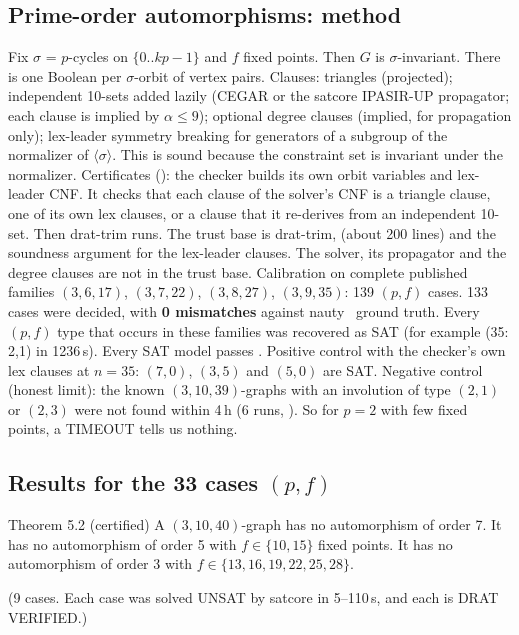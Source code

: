 \subsection{Prime-order automorphisms: method}\label{sec:sym-method}
Fix $\sigma$ = $p$-cycles on $\{0..kp-1\}$ and $f$ fixed points. Then $G$ is $\sigma$-invariant. There is one Boolean
per $\sigma$-orbit of vertex pairs. Clauses: triangles (projected); independent 10-sets added lazily
(CEGAR or the satcore IPASIR-UP propagator; each clause is implied by $\alpha \le 9$); optional degree
clauses (implied, for propagation only); lex-leader symmetry breaking for generators of a subgroup
of the normalizer of $\langle\sigma\rangle$. This is sound because the constraint set is invariant under the normalizer.
Certificates (): the checker builds its own orbit variables and lex-leader CNF. It
checks that each clause of the solver's CNF is a triangle clause, one of its own lex clauses, or a
clause that it re-derives from an independent 10-set. Then drat-trim runs. The trust base is drat-trim,
 (about 200 lines) and the soundness argument for the lex-leader clauses. The solver,
its propagator and the degree clauses are not in the trust base.
Calibration on complete published families $(3,6,17)$, $(3,7,22)$, $(3,8,27)$, $(3,9,35)$: 139 $(p,f)$
cases. 133 cases were decided, with \textbf{0 mismatches} against nauty~\cite{nauty14} ground truth. Every $(p,f)$ type that
occurs in these families was recovered as SAT (for example (35: 2,1) in 1236\,s). Every SAT model passes
. Positive control with the checker's own lex clauses at $n = 35$: $(7,0)$, $(3,5)$
and $(5,0)$ are SAT.
Negative control (honest limit): the known $(3,10,39)$-graphs with an involution of type $(2,1)$ or $(2,3)$
were not found within 4\,h (6 runs, ). So for $p = 2$ with few fixed points,
a TIMEOUT tells us nothing.

\subsection{Results for the 33 cases \texorpdfstring{$(p, f)$}{(p,f)}}\label{sec:sym-results}
\begin{namedthm}{Theorem 5.2 (certified)}
A $(3,10,40)$-graph has no automorphism of order 7. It has no automorphism of
order 5 with $f \in \{10, 15\}$ fixed points. It has no automorphism of order 3 with $f \in \{13,16,19,22,25,28\}$.
\end{namedthm}
(9 cases. Each case was solved UNSAT by satcore in 5--110\,s, and each is DRAT VERIFIED.)

